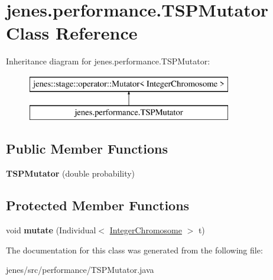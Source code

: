 \hypertarget{classjenes_1_1performance_1_1_t_s_p_mutator}{\section{jenes.\-performance.\-T\-S\-P\-Mutator Class Reference}
\label{classjenes_1_1performance_1_1_t_s_p_mutator}
}
Inheritance diagram for jenes.\-performance.\-T\-S\-P\-Mutator\-:\begin{figure}[H]
\begin{center}
\leavevmode
\includegraphics[height=2.000000cm]{classjenes_1_1performance_1_1_t_s_p_mutator}
\end{center}
\end{figure}
\subsection*{Public Member Functions}
\begin{DoxyCompactItemize}
\item 
\hypertarget{classjenes_1_1performance_1_1_t_s_p_mutator_a66ff4b3c4ac9985a10c35e6bf4005904}{{\bfseries T\-S\-P\-Mutator} (double probability)}\label{classjenes_1_1performance_1_1_t_s_p_mutator_a66ff4b3c4ac9985a10c35e6bf4005904}

\end{DoxyCompactItemize}
\subsection*{Protected Member Functions}
\begin{DoxyCompactItemize}
\item 
\hypertarget{classjenes_1_1performance_1_1_t_s_p_mutator_aefe31787293640658a112692d2c103d5}{void {\bfseries mutate} (Individual$<$ \hyperlink{classjenes_1_1chromosome_1_1_integer_chromosome}{Integer\-Chromosome} $>$ t)}\label{classjenes_1_1performance_1_1_t_s_p_mutator_aefe31787293640658a112692d2c103d5}

\end{DoxyCompactItemize}


The documentation for this class was generated from the following file\-:\begin{DoxyCompactItemize}
\item 
jenes/src/performance/T\-S\-P\-Mutator.\-java\end{DoxyCompactItemize}

